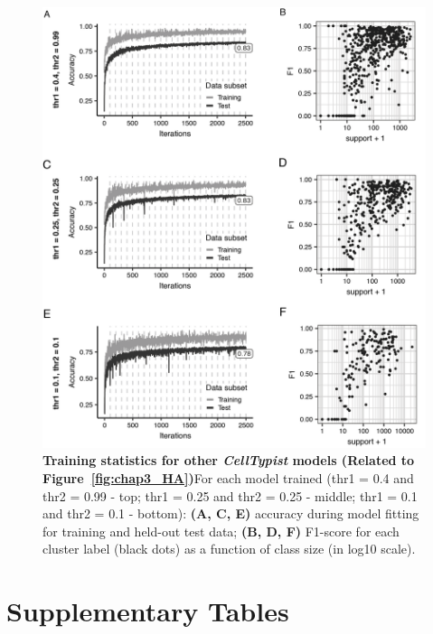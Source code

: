 \begin{figure}[ht!] 
\centering    
\includegraphics[width=1.0\textwidth]{Appendix2/Figs/appB_modelstuff.png} %
\caption[Training statistics for other \textit{CellTypist} models]{\textbf{Training statistics for other \textit{CellTypist} models (Related to Figure~\ref{fig:chap3_HA})}\newline For each model trained (thr1 = 0.4 and thr2 = 0.99 - top; thr1 = 0.25 and thr2 = 0.25 - middle; thr1 = 0.1 and thr2 = 0.1 - bottom): \textbf{(A, C, E)} accuracy during model fitting for training and held-out test data; \textbf{(B, D, F)} F1-score for each cluster label (black dots) as a function of class size (in log10 scale).}
\label{fig:appB_moremodels}
\end{figure}


\section{Supplementary Tables}
\label{sectionB1.2}

